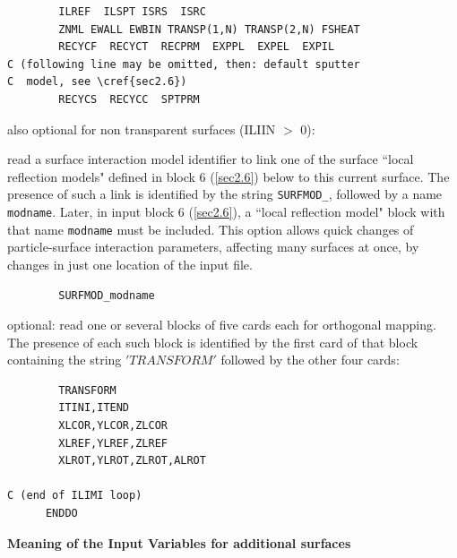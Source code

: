 \begin{lstlisting}
        ILREF  ILSPT ISRS  ISRC
        ZNML EWALL EWBIN TRANSP(1,N) TRANSP(2,N) FSHEAT
        RECYCF  RECYCT  RECPRM  EXPPL  EXPEL  EXPIL
C (following line may be omitted, then: default sputter 
C  model, see \cref{sec2.6})
        RECYCS  RECYCC  SPTPRM
\end{lstlisting}

also optional for non transparent surfaces (ILIIN $>$ 0):

read a surface interaction model identifier to link one of the surface
``local reflection
models" defined in block 6 (\cref{sec2.6}) below to this current surface.
The presence of such a link is identified by the string \lstinline|SURFMOD_|,
followed by a name \lstinline|modname|.
Later, in input block 6 (\cref{sec2.6}), a ``local reflection model" block with
that name \lstinline|modname| must be included.
This option allows quick changes of particle-surface interaction parameters,
affecting many surfaces at once, by changes in just one location of the input
file.

\begin{lstlisting}
        SURFMOD_modname
\end{lstlisting}

optional: read one or several blocks of five cards each for orthogonal
mapping.
The presence of each such block is identified by the first card of that block
containing the string $'TRANSFORM'$ followed by the other four cards:

\begin{lstlisting}
        TRANSFORM
        ITINI,ITEND
        XLCOR,YLCOR,ZLCOR
        XLREF,YLREF,ZLREF
        XLROT,YLROT,ZLROT,ALROT

C (end of ILIMI loop)
      ENDDO
\end{lstlisting}

\medskip

\textbf{Meaning of the Input Variables for additional surfaces}

\medskip 

